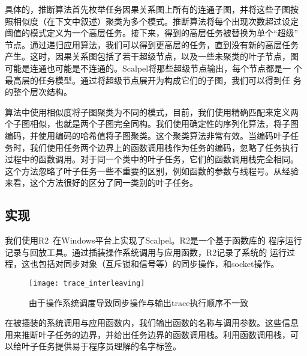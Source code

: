 具体的，推断算法首先枚举任务因果关系图上所有的连通子图，并将这些子图按
照相似度（在下文中叙述）聚类为多个模式。推断算法将每个出现次数超过设定
阈值的模式定义为一个高层任务。接下来，得到的高层任务被替换为单个“超级”
节点。通过递归应用算法，我们可以得到更高层的任务，直到没有新的高层任务
产生。这时，因果关系图包括了若干超级节点，以及一些未聚类的叶子节点，图
可能是连通也可能是不连通的。Scalpel将那些超级节点输出，每个节点都是一
个最高层的任务模型。通过将超级节点展开为构成它们的子图，我们可以得到任
务的整个层次结构。

算法中使用相似度将子图聚类为不同的模式，目前，我们使用精确匹配来定义两
个子图相似，也就是两个子图完全同构。我们使用确定性的序列化算法，将子图
编码，并使用编码的哈希值将子图聚类。这个聚类算法非常有效。当编码叶子任
务时，我们使用任务两个边界上的函数调用栈作为任务的编码，忽略了任务执行
过程中的函数调用。对于同一个类中的叶子任务，它们的函数调用栈完全相同。
这个方法忽略了叶子任务一些不重要的区别，例如函数的参数与线程号。从经验
来看，这个方法很好的区分了同一类别的叶子任务。



\subsection{实现}

我们使用R2~\cite{r2}在Windows平台上实现了Scalpel。R2是一个基于函数库的
程序运行记录与回放工具。通过插装操作系统调用与应用函数，R2记录了系统的
运行过程，这也包括对同步对象（互斥锁和信号等）的同步操作，和socket操作。

\begin{figure}
  \centering
  \begin{minipage}{0.8\linewidth}
    \centering
    \texttt{[image: trace\_interleaving]}
    \caption{由于操作系统调度导致同步操作与输出trace执行顺序不一致}
    \label{fig:trace_interleaving}
  \end{minipage}
\end{figure}

在被插装的系统调用与应用函数内，我们输出函数的名称与调用参数。这些信息
用来推断叶子任务的边界，并给出任务边界的函数调用栈。利用函数调用栈，可
以给叶子任务提供易于程序员理解的名字标签。


